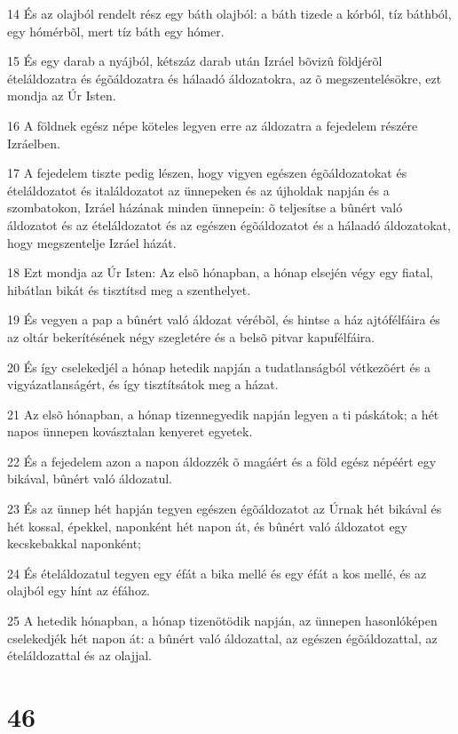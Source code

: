 \par 14 És az olajból rendelt rész egy báth olajból: a báth tizede a kórból, tíz báthból, egy hómérbõl, mert tíz báth egy hómer.
\par 15 És egy darab a nyájból, kétszáz darab után Izráel bõvizû földjérõl ételáldozatra és égõáldozatra és hálaadó áldozatokra, az õ megszentelésökre, ezt mondja az Úr Isten.
\par 16 A földnek egész népe köteles legyen erre az áldozatra a fejedelem részére Izráelben.
\par 17 A fejedelem tiszte pedig lészen, hogy vigyen egészen égõáldozatokat és ételáldozatot és italáldozatot az ünnepeken és az újholdak napján és a szombatokon, Izráel házának minden ünnepein: õ teljesítse a bûnért való áldozatot és az ételáldozatot és az egészen égõáldozatot és a hálaadó áldozatokat, hogy megszentelje Izráel házát.
\par 18 Ezt mondja az Úr Isten: Az elsõ hónapban, a hónap elsején végy egy fiatal, hibátlan bikát és tisztítsd meg a szenthelyet.
\par 19 És vegyen a pap a bûnért való áldozat vérébõl, és hintse a ház ajtófélfáira és az oltár bekerítésének négy szegletére és a belsõ pitvar kapufélfáira.
\par 20 És így cselekedjél a hónap hetedik napján a tudatlanságból vétkezõért és a vigyázatlanságért, és így tisztítsátok meg a házat.
\par 21 Az elsõ hónapban, a hónap tizennegyedik napján legyen a ti páskátok; a hét napos ünnepen kovásztalan kenyeret egyetek.
\par 22 És a fejedelem azon a napon áldozzék õ magáért és a föld egész népéért egy bikával, bûnért való áldozatul.
\par 23 És az ünnep hét hapján tegyen egészen égõáldozatot az Úrnak hét bikával és hét kossal, épekkel, naponként hét napon át, és bûnért való áldozatot egy kecskebakkal naponként;
\par 24 És ételáldozatul tegyen egy éfát a bika mellé és egy éfát a kos mellé, és az olajból egy hínt az éfához.
\par 25 A hetedik hónapban, a hónap tizenötödik napján, az ünnepen hasonlóképen cselekedjék hét napon át: a bûnért való áldozattal, az egészen égõáldozattal, az ételáldozattal és az olajjal.

\chapter{46}

